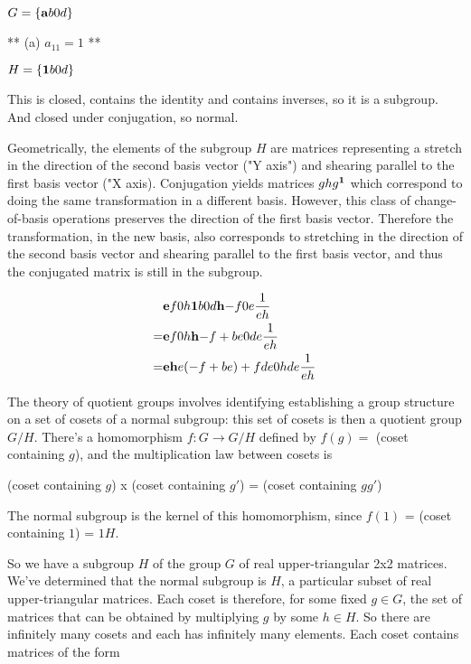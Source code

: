 $G = \left\{ \mathbf{a}{b}
                 {0}{d} \right\}$

** (a) $a_{11} = 1$ **

$H = \left\{ \mathbf{1}{b}
                 {0}{d} \right\}$

This is closed, contains the identity and contains inverses, so it is a
subgroup. And closed under conjugation, so normal.

Geometrically, the elements of the subgroup $H$ are matrices representing a
stretch in the direction of the second basis vector ("Y axis") and shearing
parallel to the first basis vector ("X axis). Conjugation yields matrices
$ghg^{\mathbf 1}$ which correspond to doing the same transformation in a different
basis. However, this class of change-of-basis operations preserves the
direction of the first basis vector. Therefore the transformation, in the new
basis, also corresponds to stretching in the direction of the second basis
vector and shearing parallel to the first basis vector, and thus the conjugated
matrix is still in the subgroup.

\begin{align*}
&\mathbf{e}{f}
     {0}{h} \mathbf{1}{b}
                {0}{d} \mathbf{h}{-f}
                           {0}{e} \frac{1}{eh} \\
= &\mathbf{e}{f}
       {0}{h} \mathbf{h}{-f + be}
                  {0}{de     } \frac{1}{eh} \\
= &\mathbf{eh}{e(-f + be) + fde}
       {0}{hde} \frac{1}{eh}
\end{align*}


The theory of quotient groups involves identifying establishing a group
structure on a set of cosets of a normal subgroup: this set of cosets is then a
quotient group $G/H$. There's a homomorphism $f:G \rightarrow G/H$ defined by
$f(g) =$ (coset containing $g$), and the multiplication law between cosets is

(coset containing $g$) x (coset containing $g'$) = (coset containing $gg'$)

The normal subgroup is the kernel of this homomorphism, since $f(1)$ = (coset
containing $1$) = $1H$.

So we have a subgroup $H$ of the group $G$ of real upper-triangular 2x2
matrices.  We've determined that the normal subgroup is $H$, a particular
subset of real upper-triangular matrices. Each coset is therefore, for some
fixed $g \in G$, the set of matrices that can be obtained by multiplying $g$ by
some $h \in H$. So there are infinitely many cosets and each has infinitely
many elements. Each coset contains matrices of the form


